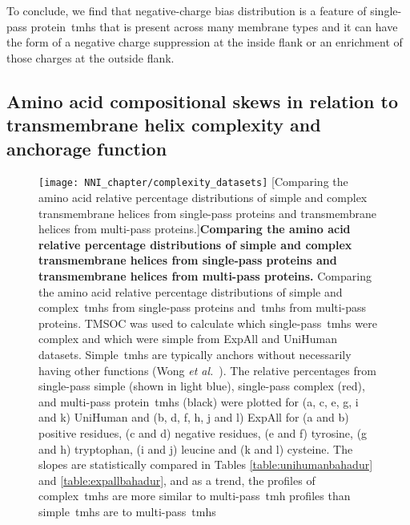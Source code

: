 To conclude, we find that negative-charge bias distribution is a feature of single-pass protein~\gls{tmh}s that is present across many membrane types and it can have the form of a negative charge suppression at the inside flank or an enrichment of those charges at the outside flank.

\subsection{Amino acid compositional skews in relation to transmembrane helix complexity and anchorage function}

\begin{figure}[p]
\centering
\texttt{[image: NNI\_chapter/complexity\_datasets]}
[Comparing the amino acid relative percentage distributions of simple and complex transmembrane helices from single-pass proteins and transmembrane helices from multi-pass proteins.]{\textbf{Comparing the amino acid relative percentage distributions of simple and complex transmembrane helices from single-pass proteins and transmembrane helices from multi-pass proteins.} Comparing the amino acid relative percentage distributions of simple and complex~\gls{tmh}s from single-pass proteins and~\gls{tmh}s from multi-pass proteins.
TMSOC was used to calculate which single-pass~\gls{tmh}s were complex and which were simple from ExpAll and UniHuman datasets.
Simple~\gls{tmh}s are typically anchors without necessarily having other functions (Wong \textit{et al.}~\cite{Wong2010}).
The relative percentages from single-pass simple (shown in light blue), single-pass complex (red), and multi-pass protein~\gls{tmh}s (black) were plotted for (a, c, e, g, i and k) UniHuman and (b, d, f, h, j and l) ExpAll for (a and b) positive residues, (c and d) negative residues, (e and f) tyrosine, (g and h) tryptophan, (i and j) leucine and (k and l) cysteine.
The slopes are statistically compared in Tables \ref{table:unihumanbahadur} and \ref{table:expallbahadur}, and as a trend, the profiles of complex~\gls{tmh}s are more similar to multi-pass~\gls{tmh} profiles than simple~\gls{tmh}s are to multi-pass~\gls{tmh}s}

\label{fig:complexity_datasets}
\end{figure}

